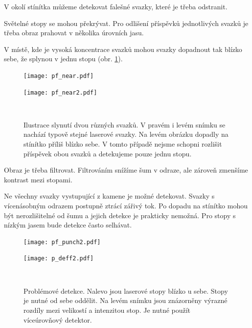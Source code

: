 V okolí stínítka můžeme detekovat falešné svazky, které je třeba odstranit. 

Světelné stopy se mohou překrývat. Pro odlišení příspěvků jednotlivých svazků je třeba obraz prahovat v několika úrovních jasu.

V místě, kde je vysoká koncentrace svazků mohou svazky dopadnout tak blízko sebe, že splynou v jednu stopu (obr. \ref{Splynuti}).  

\begin{figure}[h!]
    \centering
    \begin{minipage}[c]{0.48\textwidth}
        \centering\texttt{[image: pf\_near.pdf]}
    \end{minipage}
    \begin{minipage}[c]{0.48\textwidth}
        \centering\texttt{[image: pf\_near2.pdf]}
    \end{minipage}
    \\
        \caption[Slynutí dvou různých svazků.]{Ilustrace slynutí dvou různých svazků. V pravém i levém snímku se nachází typově stejné laserové svazky. Na levém obrázku dopadly na stínítko příliš blízko sebe. V tomto případě nejsme schopni rozlišit příspěvek obou svazků a detekujeme pouze jednu stopu.}
        \label{Splynuti}
\end{figure}

Obraz je třeba filtrovat. Filtrováním snížíme šum v odraze, ale zároveň zmenšíme kontrast mezi stopami. 

Ne všechny svazky vystupující z kamene je možné detekovat. Svazky s vícenásobným odrazem postupně ztrácí zářivý tok. Po dopadu na stínítko mohou být nerozlišitelné od šumu a jejich detekce je prakticky nemožná. Pro stopy s nízkým jasem bude detekce často selhávat.

\begin{figure}[h!]
    \centering
    \begin{minipage}[c]{0.48\textwidth}
        \centering\texttt{[image: pf\_punch2.pdf]}
    \end{minipage}
    \begin{minipage}[c]{0.48\textwidth}
        \centering\texttt{[image: p\_deff2.pdf]}
    \end{minipage}
    \\
        \caption[Problémové detekce.]{Problémové detekce. Nalevo jsou laserové stopy blízko u sebe. Stopy je nutné od sebe oddělit. Na levém snímku jsou znázorněny výrazné rozdíly mezi velikostí a intenzitou stop. Je nutné použít víceúrovňový detektor. }
        \label{fig:Detekce}
\end{figure}

